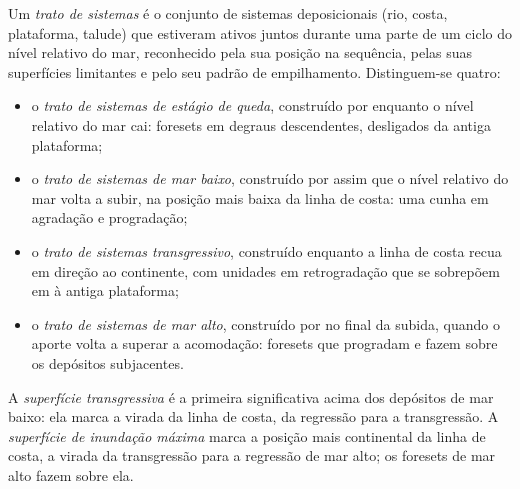 \begin{definition}\label{def:b3:sequence-stratigraphy:tract}
Um \emph{trato de sistemas} é o conjunto de
sistemas deposicionais (rio, costa, plataforma, talude) que estiveram ativos juntos durante uma
parte de um ciclo do nível relativo do mar, reconhecido pela sua posição na
sequência, pelas suas superfícies limitantes e pelo seu padrão de empilhamento. Distinguem-se
quatro:
\begin{itemize}
\item o \emph{trato de sistemas de estágio de queda},
  construído por  enquanto o nível relativo do mar cai:
  foresets em degraus descendentes, desligados da antiga plataforma;
\item o \emph{trato de sistemas de mar baixo},
  construído por  assim que o nível relativo do mar volta a subir,
  na posição mais baixa da linha de costa: uma cunha em agradação e progradação;
\item o \emph{trato de sistemas transgressivo},
  construído enquanto a linha de costa recua em direção ao continente, com unidades
  em retrogradação que se sobrepõem em  à antiga plataforma;
\item o \emph{trato de sistemas de mar alto},
  construído por  no final da subida, quando o aporte volta a
  superar a acomodação: foresets que progradam e fazem  sobre os depósitos subjacentes.
\end{itemize}
\end{definition}

\begin{definition}\label{def:b3:sequence-stratigraphy:surfaces}
A \emph{superfície transgressiva} é a primeira
 significativa acima dos depósitos de mar baixo: ela marca a
virada da linha de costa, da regressão para a transgressão. A \emph{superfície de
inundação máxima} marca a posição mais
continental da linha de costa, a virada da transgressão para a regressão de mar alto; os
foresets de mar alto fazem  sobre ela.
\end{definition}

